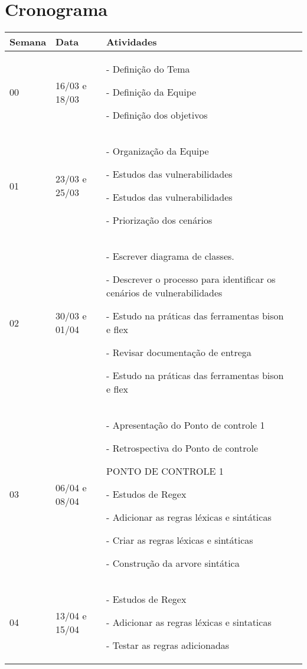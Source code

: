 \chapter{Cronograma}

\begin{table}[htb]
\center
\footnotesize
\begin{tabular}{|p{1.4cm}|p{3cm}|p{8cm}|p{8cm}|}
  \hline
   \textbf{Semana} & \textbf{Data}  & \textbf{Atividades}  \\
    \hline
    00 &  16/03 e 18/03  & 
   \par - Definição do Tema 
   \par - Definição da Equipe 
   \par - Definição dos objetivos  \\
   \hline
    01 & 23/03 e 25/03 &
   \par - Organização da Equipe 
   \par - Estudos das vulnerabilidades 
   \par - Estudos das vulnerabilidades 
   \par - Priorização dos cenários \\
   \hline
    02 & 30/03 e 01/04 &
   \par - Escrever diagrama de classes. 
   \par - Descrever o processo para identificar os cenários de vulnerabilidades 
   \par - Estudo na práticas das ferramentas bison e flex 
   \par - Revisar documentação de entrega 
   \par - Estudo na práticas das ferramentas bison e flex \\
   \hline
    03 & 06/04 e 08/04 &
   \par - Apresentação do Ponto de controle 1 
   \par - Retrospectiva do Ponto de controle 
   \par PONTO DE CONTROLE 1 
   \par - Estudos de Regex 
   \par - Adicionar as regras léxicas e sintáticas 
   \par - Criar as regras léxicas e sintáticas 
   \par - Construção da arvore sintática \\
   \hline
    04 & 13/04 e 15/04 &
   \par - Estudos de Regex 
   \par - Adicionar as regras léxicas e sintaticas 
   \par - Testar as regras adicionadas 

\end{tabular}
\end{table}
